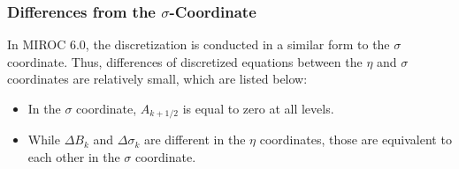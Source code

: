 \hypertarget{differences-from-the-sigma-coordinate}{%
\subsubsection{\texorpdfstring{Differences from the
\(\sigma\)-Coordinate}{Differences from the \textbackslash{}sigma-Coordinate}}\label{differences-from-the-sigma-coordinate}}

In MIROC 6.0, the discretization is conducted in a similar form to the \(\sigma\) coordinate.
Thus, differences of discretized equations between the $\eta$ and $\sigma$ coordinates are relatively small, which are listed below:

\begin{itemize}
\tightlist
\item
  In the $\sigma$ coordinate, \(A_{k+1/2}\) is equal to zero at all levels.
\item
  While \(\Delta B_k\) and \(\Delta \sigma_k\) are different in the $\eta$ coordinates, those are equivalent to each other in the \(\sigma\) coordinate.
\end{itemize}
